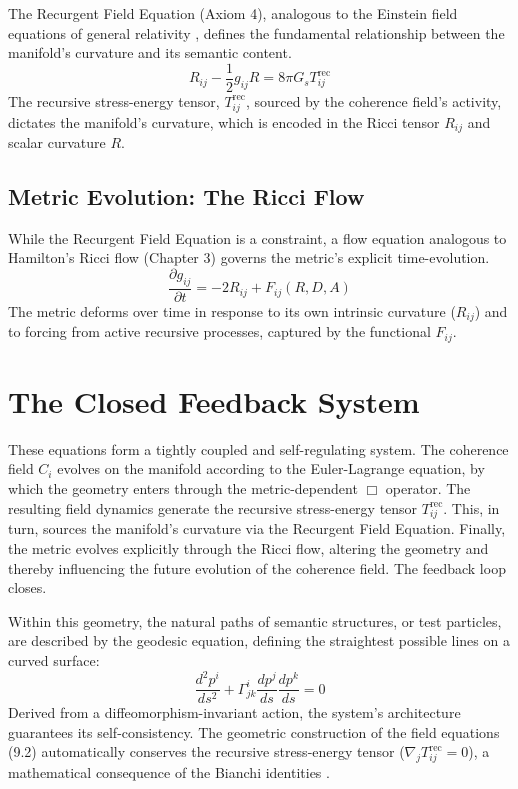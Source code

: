 The Recurgent Field Equation (Axiom 4), analogous to the Einstein field equations of general relativity \autocite{Einstein1915}, defines the fundamental relationship between the manifold's curvature and its semantic content.
\begin{equation}
R_{ij} - \frac{1}{2}g_{ij}R = 8\pi G_s T^{\text{rec}}_{ij}
\end{equation}
The recursive stress-energy tensor, \(T^{\text{rec}}_{ij}\), sourced by the coherence field's activity, dictates the manifold's curvature, which is encoded in the Ricci tensor \(R_{ij}\) and scalar curvature \(R\).

\subsection{Metric Evolution: The Ricci Flow}

While the Recurgent Field Equation is a constraint, a flow equation analogous to Hamilton's Ricci flow (Chapter 3) \autocite{Hamilton1982} governs the metric's explicit time-evolution.
\begin{equation}
\frac{\partial g_{ij}}{\partial t} = -2 R_{ij} + F_{ij}(R, D, A)
\end{equation}
The metric deforms over time in response to its own intrinsic curvature (\(R_{ij}\)) and to forcing from active recursive processes, captured by the functional \(F_{ij}\).

\section{The Closed Feedback System}

These equations form a tightly coupled and self-regulating system. The coherence field \(C_i\) evolves on the manifold according to the Euler-Lagrange equation, by which the geometry enters through the metric-dependent \(\Box\) operator. The resulting field dynamics generate the recursive stress-energy tensor \(T^{\text{rec}}_{ij}\). This, in turn, sources the manifold's curvature via the Recurgent Field Equation. Finally, the metric evolves explicitly through the Ricci flow, altering the geometry and thereby influencing the future evolution of the coherence field. The feedback loop closes.

Within this geometry, the natural paths of semantic structures, or test particles, are described by the geodesic equation, defining the straightest possible lines on a curved surface:
\begin{equation}
\frac{d^2 p^i}{ds^2} + \Gamma^i_{jk} \frac{dp^j}{ds} \frac{dp^k}{ds} = 0
\end{equation}
Derived from a diffeomorphism-invariant action, the system's architecture guarantees its self-consistency. The geometric construction of the field equations (9.2) automatically conserves the recursive stress-energy tensor ($\nabla_j T^{\text{rec}}_{ij} = 0$), a mathematical consequence of the Bianchi identities \autocite{Bianchi1902}. 